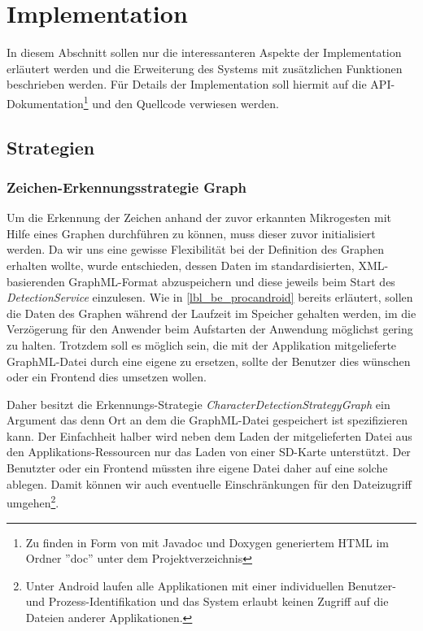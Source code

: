\section{Implementation}

In diesem Abschnitt sollen nur die interessanteren Aspekte der Implementation erläutert werden und die Erweiterung des Systems mit zusätzlichen Funktionen beschrieben werden. Für Details der Implementation soll hiermit auf die API-Dokumentation\footnote{Zu finden in Form von mit Javadoc und Doxygen generiertem HTML im Ordner ''doc'' unter dem Projektverzeichnis} und den Quellcode verwiesen werden.

\subsection{Strategien}

\subsubsection{Zeichen-Erkennungsstrategie Graph}

Um die Erkennung der Zeichen anhand der zuvor erkannten Mikrogesten mit Hilfe eines Graphen durchführen zu können, muss dieser zuvor initialisiert werden. Da wir uns eine gewisse Flexibilität bei der Definition des Graphen erhalten wollte, wurde entschieden, dessen Daten im standardisierten, XML-basierenden GraphML-Format\cite{graphml_primer} abzuspeichern und diese jeweils beim Start des \emph{DetectionService} einzulesen. Wie in \ref{lbl_be_procandroid} bereits erläutert, sollen die Daten des Graphen während der Laufzeit im Speicher gehalten werden, im die Verzögerung für den Anwender beim Aufstarten der Anwendung möglichst gering zu halten. Trotzdem soll es möglich sein, die mit der Applikation mitgelieferte GraphML-Datei durch eine eigene zu ersetzen, sollte der Benutzer dies wünschen oder ein Frontend dies umsetzen wollen.

Daher besitzt die Erkennungs-Strategie \emph{CharacterDetectionStrategyGraph} ein Argument das denn Ort an dem die GraphML-Datei gespeichert ist spezifizieren kann. Der Einfachheit halber wird neben dem Laden der mitgelieferten Datei aus den Applikations-Ressourcen nur das Laden von einer SD-Karte unterstützt. Der Benutzter oder ein Frontend müssten ihre eigene Datei daher auf eine solche ablegen. Damit können wir auch eventuelle Einschränkungen für den Dateizugriff umgehen\footnote{Unter Android laufen alle Applikationen mit einer individuellen Benutzer- und Prozess-Identifikation und das System erlaubt keinen Zugriff auf die Dateien anderer Applikationen.}.

